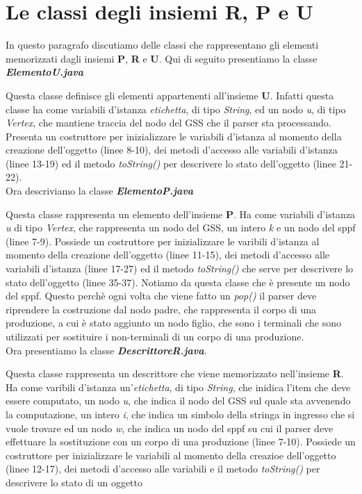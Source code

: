 \section{Le classi degli insiemi R, P e U}
In questo paragrafo discutiamo delle classi che rappresentano gli elementi memorizzati dagli insiemi \textbf{P}, \textbf{R} e \textbf{U}. Qui di seguito presentiamo la classe \textbf{\textit{ElementoU.java}}

Questa classe definisce gli elementi appartenenti all'insieme \textbf{U}. Infatti questa classe ha come variabili d'istanza \textit{etichetta}, di tipo \textit{String}, ed un nodo \textit{u}, di tipo \textit{Vertex}, che mantiene traccia del nodo del GSS che il parser sta processando. Presenta un costruttore per inizializzare le variabili d'istanza al momento della creazione dell'oggetto (linee 8-10), dei metodi d'accesso alle variabili d'istanza (linee 13-19) ed il metodo \textit{ toString()} per descrivere lo stato dell'oggetto (linee 21-22).\\
Ora descriviamo la classe \textbf{\textit{ElementoP.java}}

Questa classe rappresenta un elemento dell'insieme \textbf{P}. Ha come variabili d'istanza \textit{u} di tipo \textit{Vertex}, che rappresenta un nodo del GSS, un intero \textit{k} e un nodo del sppf (linee 7-9). Possiede un costruttore  per inizializzare le varibili d'istanza al momento della creazione dell'oggetto (linee 11-15), dei metodi d'accesso alle variabili d'istanza (linee 17-27) ed il metodo \textit{toString()} che serve per descrivere lo stato dell'oggetto (linee 35-37). Notiamo da questa classe che è presente un nodo del sppf. Questo perchè ogni volta che viene fatto un \textit{pop()} il parser deve riprendere la costruzione dal nodo padre, che rappresenta il corpo di una produzione, a cui è stato aggiunto un nodo figlio, che sono i terminali che sono utilizzati per sostituire i non-terminali di un corpo di una produzione.\\
Ora presentiamo la classe \textbf{\textit{DescrittoreR.java}}.

Questa classe rappresenta un descrittore che viene memorizzato nell'insieme \textbf{R}. Ha come varibili d'istanza un'\textit{etichetta}, di tipo \textit{String}, che inidica l'item che deve essere computato, un nodo \textit{u}, che indica il nodo del GSS sul quale sta avvenendo la computazione, un intero \textit{i}, che indica un simbolo della stringa in ingresso che si vuole trovare ed un nodo \textit{w}, che indica un nodo del sppf su cui il parser deve effettuare la sostituzione con un corpo di una produzione (linee 7-10). Possiede un costruttore per inizializzare le variabili al momento della creazioe dell'oggetto (linee 12-17), dei metodi d'accesso alle variabili e il metodo \textit{toString()} per descrivere lo stato di un oggetto
